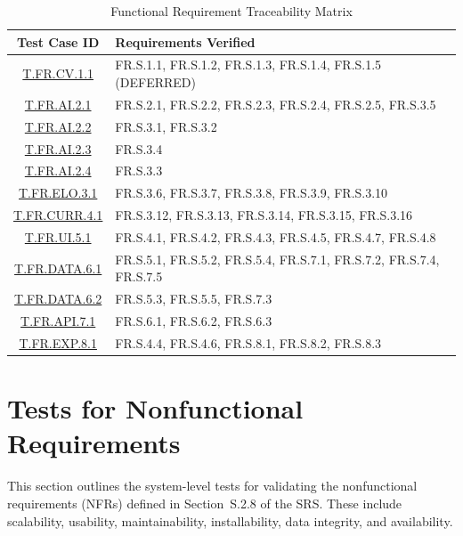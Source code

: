 \documentclass[12pt, titlepage]{article}
\begin{document}
\begin{table}[H]
  \centering
  \caption{Functional Requirement Traceability Matrix}
  \label{tab:traceability}
  \begin{tabularx}{\textwidth}{|c|>{\raggedright\arraybackslash}X|}
    \hline
    \textbf{Test Case ID} & \textbf{Requirements Verified} \\
    \hline
    \hyperlink{T.FR.CV.1.1}{T.FR.CV.1.1} & FR.S.1.1, FR.S.1.2, FR.S.1.3, FR.S.1.4, FR.S.1.5 (DEFERRED) \\
    \hline
    \hyperlink{T.FR.AI.2.1}{T.FR.AI.2.1} & FR.S.2.1, FR.S.2.2, FR.S.2.3, FR.S.2.4, FR.S.2.5, FR.S.3.5 \\
    \hline
    \hyperlink{T.FR.AI.2.2}{T.FR.AI.2.2} & FR.S.3.1, FR.S.3.2 \\
    \hline
    \hyperlink{T.FR.AI.2.3}{T.FR.AI.2.3} & FR.S.3.4 \\
    \hline
    \hyperlink{T.FR.AI.2.4}{T.FR.AI.2.4} & FR.S.3.3 \\
    \hline
    \hyperlink{T.FR.ELO.3.1}{T.FR.ELO.3.1} & FR.S.3.6, FR.S.3.7, FR.S.3.8, FR.S.3.9, FR.S.3.10 \\
    \hline
    \hyperlink{T.FR.CURR.4.1}{T.FR.CURR.4.1} & FR.S.3.12, FR.S.3.13, FR.S.3.14, FR.S.3.15, FR.S.3.16 \\
    \hline
    \hyperlink{T.FR.UI.5.1}{T.FR.UI.5.1} & FR.S.4.1, FR.S.4.2, FR.S.4.3, FR.S.4.5, FR.S.4.7, FR.S.4.8 \\
    \hline
    \hyperlink{T.FR.DATA.6.1}{T.FR.DATA.6.1} & FR.S.5.1, FR.S.5.2, FR.S.5.4, FR.S.7.1, FR.S.7.2, FR.S.7.4, FR.S.7.5 \\
    \hline
    \hyperlink{T.FR.DATA.6.2}{T.FR.DATA.6.2} & FR.S.5.3, FR.S.5.5, FR.S.7.3 \\
    \hline
    \hyperlink{T.FR.API.7.1}{T.FR.API.7.1} & FR.S.6.1, FR.S.6.2, FR.S.6.3 \\
    \hline
    \hyperlink{T.FR.EXP.8.1}{T.FR.EXP.8.1} & FR.S.4.4, FR.S.4.6, FR.S.8.1, FR.S.8.2, FR.S.8.3 \\
    \hline
  \end{tabularx}
\end{table}


\section{Tests for Nonfunctional Requirements}

This section outlines the system-level tests for validating the nonfunctional requirements (NFRs) defined in Section~S.2.8 of the SRS. These include scalability, usability, maintainability, installability, data integrity, and availability.
\end{document}
